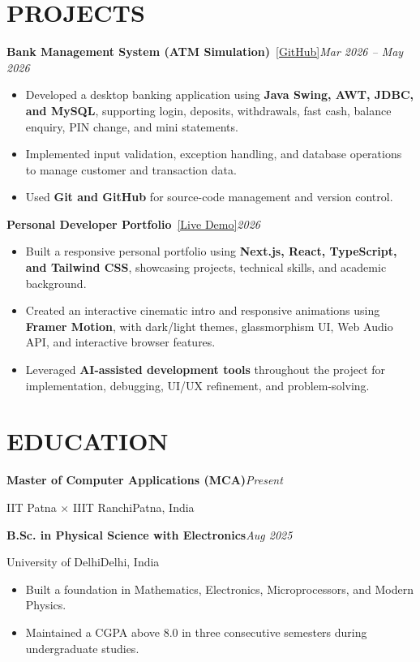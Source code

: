 \documentclass[10pt,letterpaper]{article}
\newcommand{\portfoliourl}{https://portfolio-one-phi-bh3n1xdisv.vercel.app/} %
\newcommand{\bankprojecturl}{https://github.com/riteshkumar999097-afk/bank-management-system}
\newcommand{\entry}[2]{\textbf{#1}\hfill\textit{#2}\par}
\newcommand{\entrylink}[4]{\textbf{#1}\ \href{#3}{\small[#4]}\hfill\textit{#2}\par}
\newcommand{\subentry}[2]{#1\hfill #2\par}
\begin{document}
\section*{PROJECTS}

\entrylink{Bank Management System (ATM Simulation)}{Mar 2026 -- May 2026}{\bankprojecturl}{GitHub}
\begin{itemize}
  \item Developed a desktop banking application using \textbf{Java Swing, AWT, JDBC, and MySQL}, supporting login, deposits, withdrawals, fast cash, balance enquiry, PIN change, and mini statements.
  \item Implemented input validation, exception handling, and database operations to manage customer and transaction data.
  \item Used \textbf{Git and GitHub} for source-code management and version control.
\end{itemize}

\vspace{3pt}
\entrylink{Personal Developer Portfolio}{2026}{\portfoliourl}{Live Demo}
\begin{itemize}
  \item Built a responsive personal portfolio using \textbf{Next.js, React, TypeScript, and Tailwind CSS}, showcasing projects, technical skills, and academic background.
  \item Created an interactive cinematic intro and responsive animations using \textbf{Framer Motion}, with dark/light themes, glassmorphism UI, Web Audio API, and interactive browser features.
  \item Leveraged \textbf{AI-assisted development tools} throughout the project for implementation, debugging, UI/UX refinement, and problem-solving.
\end{itemize}

\section*{EDUCATION}

\entry{Master of Computer Applications (MCA)}{Present}
\subentry{IIT Patna $\times$ IIIT Ranchi}{Patna, India}

\vspace{3pt}
\entry{B.Sc. in Physical Science with Electronics}{Aug 2025}
\subentry{University of Delhi}{Delhi, India}
\begin{itemize}
  \item Built a foundation in Mathematics, Electronics, Microprocessors, and Modern Physics.
  \item Maintained a CGPA above 8.0 in three consecutive semesters during undergraduate studies.
\end{itemize}
\end{document}
